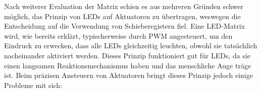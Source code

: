 Nach weiterer Evaluation der Matrix schien es aus mehreren Gründen schwer möglich, das Prinzip von LEDs auf Aktuatoren
zu übertragen, weswegen die Entscheidung auf die Verwendung von Schieberegistern fiel. \newline
Eine LED-Matrix wird, wie bereits erklärt,
typischerweise durch \ac{PWM} angesteuert, um den Eindruck zu erwecken, dass alle
LEDs gleichzeitig leuchten, obwohl sie tatsächlich nacheinander aktiviert werden. Dieses Prinzip funktioniert gut für LEDs,
da sie einen langsamen Reaktionsmechanismus haben und das menschliche Auge träge ist.
Beim präzisen Ansteuern von Aktuatoren bringt dieses Prinzip jedoch einige Probleme mit sich:

